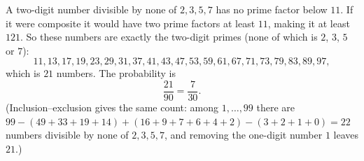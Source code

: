 A two-digit number divisible by none of $2,3,5,7$ has no prime factor below $11$. If it were composite it would have two prime factors at least $11$, making it at least $121$. So these numbers are exactly the two-digit primes (none of which is $2$, $3$, $5$ or $7$):
\[
11,13,17,19,23,29,31,37,41,43,47,53,59,61,67,71,73,79,83,89,97,
\]
which is $21$ numbers. The probability is
\[
\dfrac{21}{90}=\boxed{\dfrac{7}{30}}.
\]
(Inclusion--exclusion gives the same count: among $1,\dots,99$ there are $99-(49+33+19+14)+(16+9+7+6+4+2)-(3+2+1+0)=22$ numbers divisible by none of $2,3,5,7$, and removing the one-digit number $1$ leaves $21$.)
